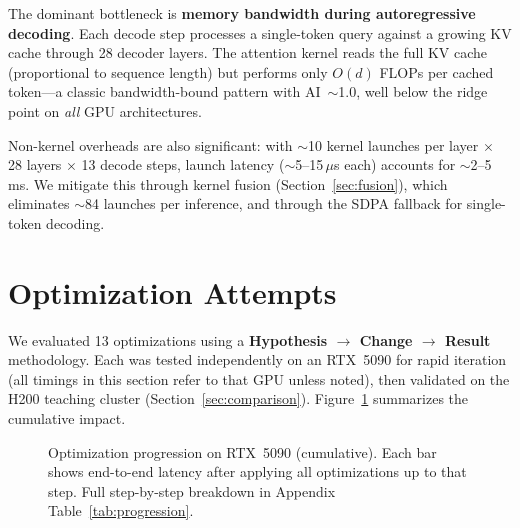 \documentclass{article}
\begin{document}
The dominant bottleneck is \textbf{memory bandwidth during autoregressive decoding}.  Each decode step processes a single-token query against a growing KV cache through 28 decoder layers.  The attention kernel reads the full KV cache (proportional to sequence length) but performs only $O(d)$ FLOPs per cached token---a classic bandwidth-bound pattern with AI~$\sim$1.0, well below the ridge point on \emph{all} GPU architectures.

Non-kernel overheads are also significant: with $\sim$10 kernel launches per layer $\times$ 28 layers $\times$ 13 decode steps, launch latency ($\sim$5--15\,$\mu$s each) accounts for $\sim$2--5\,ms.  We mitigate this through kernel fusion (Section~\ref{sec:fusion}), which eliminates $\sim$84 launches per inference, and through the SDPA fallback for single-token decoding.


\section{Optimization Attempts}\label{sec:optimization}

We evaluated 13 optimizations using a \textbf{Hypothesis $\to$ Change $\to$ Result} methodology.  Each was tested independently on an RTX~5090 for rapid iteration (all timings in this section refer to that GPU unless noted), then validated on the H200 teaching cluster (Section~\ref{sec:comparison}).
Figure~\ref{fig:progression} summarizes the cumulative impact.

\begin{figure}[h]
\centering
{}
\vspace{-1ex}
\caption{Optimization progression on RTX~5090 (cumulative).  Each bar shows end-to-end latency after applying all optimizations up to that step.  Full step-by-step breakdown in Appendix Table~\ref{tab:progression}.}
\label{fig:progression}
\end{figure}
\end{document}
